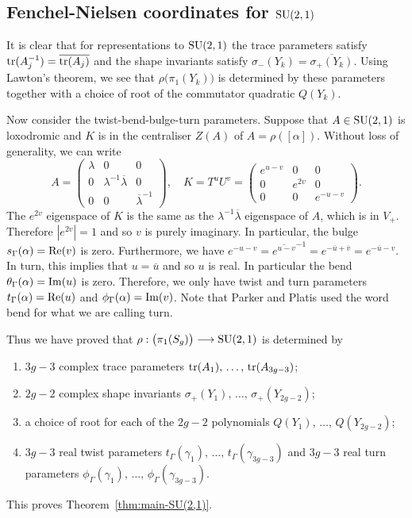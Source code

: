 \documentclass[11pt]{amsart}
\numberwithin{equation}{section}
\begin{document}
\subsection{Fenchel-Nielsen coordinates for ${\rm SU}(2,1)$}

It is clear that for representations to ${\rm SU}(2,1)$ the trace parameters satisfy
${\rm tr}(A_j^{-1})=\overline{{\rm tr}(A_j)}$ and the shape invariants satisfy $\sigma_-(Y_k)=\overline{\sigma_+(Y_k)}$. 
Using Lawton's theorem, we see that $\rho\bigl(\pi_1(Y_k)\bigr)$ is determined by these parameters together with a choice of
root of the commutator quadratic $Q(Y_k)$. 

Now consider the twist-bend-bulge-turn parameters. Suppose that $A\in{\rm SU}(2,1)$ is loxodromic
and $K$ is in the centraliser $Z(A)$ of $A=\rho([\alpha])$. Without loss of generality, we can write
$$
A=\left(\begin{matrix} \lambda & 0 & 0 \\ 0 & \lambda^{-1}\overline{\lambda} & 0 \\
0 & 0 & \overline{\lambda}^{-1} \end{matrix}\right),\quad
K=T^uU^v=\left(\begin{matrix} e^{u-v} & 0 & 0 \\ 0 & e^{2v} & 0 \\ 0 & 0 & e^{-u-v} \end{matrix}\right).
$$
The $e^{2v}$ eigenspace of $K$ is the same as the $\lambda^{-1}\overline{\lambda}$ eigenspace of $A$,
which is in $V_+$. Therefore $|e^{2v}|=1$ and so $v$ is purely imaginary. In particular, the bulge 
$s_\Gamma(\alpha)={\rm Re}(v)$ is zero.
Furthermore, we have $e^{-u-v}=\overline{e^{u-v}}^{-1}=e^{-\overline{u}+\overline{v}}=e^{-\overline{u}-v}$.
In turn, this implies that $u=\overline{u}$ and so $u$ is real. In particular the bend 
$\theta_\Gamma(\alpha)={\rm Im}(u)$ is zero. Therefore, 
we only have twist and turn parameters $t_\Gamma(\alpha)={\rm Re}(u)$ and $\phi_\Gamma(\alpha)={\rm Im}(v)$. 
Note that Parker and Platis used the word bend for what we are calling turn.

Thus we have proved that $\rho:\bigl(\pi_1(S_g)\bigr)\longrightarrow {\rm SU}(2,1)$ is determined by
\begin{enumerate}
\item[(1)] $3g-3$ complex trace parameters ${\rm tr}(A_1),\,\ldots,\,{\rm tr}(A_{3g-3})$;
\item[(2)] $2g-2$ complex shape invariants $\sigma_+(Y_1),\,\ldots,\,\sigma_+(Y_{2g-2})$;
\item[(3)] a choice of root for each of the $2g-2$ polynomials $Q(Y_1),\,\ldots,\, Q(Y_{2g-2})$;
\item[(4)] $3g-3$ real twist parameters $t_\Gamma(\gamma_1),\,\ldots,\, t_\Gamma(\gamma_{3g-3})$ and 
$3g-3$ real turn parameters $\phi_\Gamma(\gamma_1),\,\ldots,\, \phi_\Gamma(\gamma_{3g-3})$.
\end{enumerate}
This proves Theorem~\ref{thm:main-SU(2,1)}. 
\end{document}
